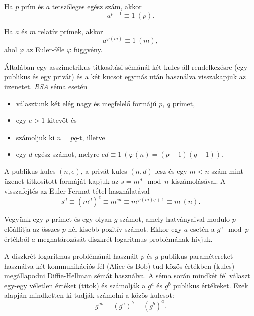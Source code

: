 
\begin{theorem}
  Ha $p$ prím és $a$ tetszőleges egész szám, akkor\[ a^{p-1}\equiv 1\ (p).\]
\end{theorem}

\begin{theorem}
  Ha $a$ és $m$ relatív prímek, akkor \[ a^{\varphi(m)}\equiv 1\ (m), \] ahol $\varphi$ az
  Euler-féle $\varphi$ függvény.
\end{theorem}

\begin{definition}
  Általában egy asszimetrikus titkosítási sémánál két kulcs áll rendelkezésre (egy publikus és egy
  privát) és a két kucsot egymás után használva visszakapjuk az üzenetet. \emph{RSA} séma esetén
  \begin{itemize}
    \item választunk két elég nagy és megfelelő formájú $p$, $q$ prímet,
    \item egy $e>1$ kitevőt és
    \item számoljuk ki $n=pq$-t, illetve
    \item egy $d$ egész számot, melyre $ed\equiv 1\ (\varphi(n)=(p-1)(q-1))$.
  \end{itemize}
  A publikus kulcs $(n,e)$, a privát kulcs $(n,d)$ lesz és egy $m<n$ szám mint üzenet titkosított
  formáját kapjuk az $s = m^d \mod n$ kiszámolásával. A visszafejtés az Euler-Fermat-tétel
  használatával \[ s^d\equiv (m^d)^e\equiv m^{ed}\equiv m^{\varphi(m)q+1}\equiv m\ (n). \]
\end{definition}

\begin{definition}
  Vegyünk egy $p$ prímet és egy olyan $g$ számot, amely hatványaival modulo $p$ előállítja az
  összes $p$-nél kisebb pozitív számot. Ekkor egy $a$ esetén a $g^a\mod p$ értékből $a$
  meghatározását diszkrét logaritmus problémának hívjuk.
\end{definition}

\begin{definition}
  A diszkrét logaritmus problémánál használt $p$ és $g$ publikus paramétereket használva két
  kommunikációs fél (Alice és Bob) tud közös értékben (kulcs) megállapodni Diffie-Hellman
  sémát használva. A séma során mindkét fél választ egy-egy véletlen értéket (titok) és számolják a
  $g^a$ és $g^b$ publikus értékeket. Ezek alapján mindketten ki tudják számolni a közös kulcsot:
  \[g^{ab} = (g^a)^b = (g^b)^a.\]
\end{definition}


